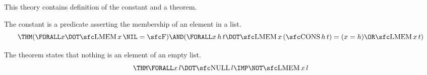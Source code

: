 
This theory contains definition of the constant  and a theorem.


The constant  is a predicate asserting the membership of an
element in a list.
\begin{equation}
\THM (\FORALL x\DOT \CONST{LMEM} \,x \,\NIL  = \CONST{F}) \AND 
     (\FORALL x \,h \,t\DOT \CONST{LMEM} \,x \,(\CONST{CONS} \,h \,t) =
                               (x = h) \OR  \CONST{LMEM} \,x \,t)
\end{equation}
\begin{comment} 
\pline{
}{let\ LMEM\char"5F DEF\ =\ new\char"5F list\char"5F rec\char"5F definition(`LMEM\char"5F DEF`,}
\pline{
}{\ "(LMEM\ x\ []\ =\ F)\ /\char"5C }
\pline{
}{\ \ (LMEM\ x\ (CONS\ (h:*)\ t)\ =\ (x\ =\ h)\ \char"5C /\ (LMEM\ x\ t))");;}
\end{comment}


The theorem  states that nothing is an element
of an empty list. 
\begin{equation}
\THM \FORALL x \,l\DOT \CONST{NULL} \,l \IMP  \NOT \CONST{LMEM} \,x \,l
\end{equation}
\begin{comment} 
\pline{
}{let\ NULL\char"5F NOT\char"5F LMEM\ =\ prove\char"5F thm(`NULL\char"5F NOT\char"5F LMEM`,}
\pline{
}{\ \ \ \ "!(x:*)\ l.\ NULL\ l\ ==>\ \char"7E (LMEM\ x\ l)",}
\pline{
}{\ \ \ \ GEN\char"5F TAC\ THEN\ LIST\char"5F INDUCT\char"5F TAC\ THEN\ REWRITE\char"5F TAC[NULL;LMEM\char"5F DEF]);;}
\end{comment}

